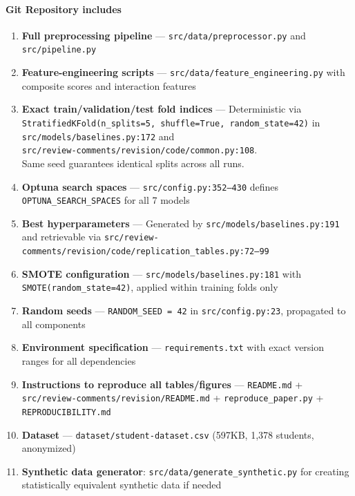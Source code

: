 \documentclass[11pt,a4paper]{article}
\newcommand{\filebox}[1]{\texttt{\small #1}}
\newcommand{\stress}[1]{\textbf{#1}}
\begin{document}
\paragraph{Git Repository includes}
\begin{enumerate}

  \item \stress{Full preprocessing pipeline} — \checkmark \filebox{src/data/preprocessor.py} and \filebox{src/pipeline.py}
  \item \stress{Feature-engineering scripts} — \checkmark \filebox{src/data/feature\_engineering.py} with composite scores and interaction features
  \item \stress{Exact train/validation/test fold indices} — \checkmark Deterministic via \texttt{StratifiedKFold(n\_splits=5, shuffle=True, random\_state=42)} in \filebox{src/models/baselines.py:172} and\\ \filebox{src/review-comments/revision/code/common.py:108}. \\ Same seed guarantees identical splits across all runs.
  \item \stress{Optuna search spaces} — \checkmark \filebox{src/config.py:352--430} defines \texttt{OPTUNA\_SEARCH\_SPACES} for all 7 models
  \item \stress{Best hyperparameters} — \checkmark Generated by \filebox{src/models/baselines.py:191} and retrievable via \filebox{src/review-comments/revision/code/replication\_tables.py:72--99}
  \item \stress{SMOTE configuration} — \checkmark \filebox{src/models/baselines.py:181} with \texttt{SMOTE(random\_state=42)}, applied within training folds only
  \item \stress{Random seeds} — \checkmark \texttt{RANDOM\_SEED = 42} in \filebox{src/config.py:23}, propagated to all components
  \item \stress{Environment specification} — \checkmark \filebox{requirements.txt} with exact version ranges for all dependencies
  \item \stress{Instructions to reproduce all tables/figures} — \checkmark \filebox{README.md} + \filebox{src/review-comments/revision/README.md} + \filebox{reproduce\_paper.py} + \filebox{REPRODUCIBILITY.md}
  \item \stress{Dataset} — \checkmark \filebox{dataset/student-dataset.csv} (597KB, 1,378 students, anonymized)
    \item \stress{Synthetic data generator}:  \checkmark \filebox{src/data/generate\_synthetic.py} for creating statistically equivalent synthetic data if needed
\end{enumerate}
\end{document}
